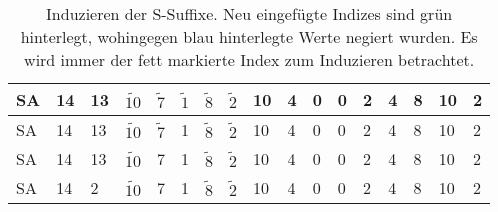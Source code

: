 \begin{table}
{\begin{tabular}{l|lllllllllllllll|l}
			SA & 14                         & 13 & $\widetilde{10}$ & \cellcolor[HTML]{32CB00}$\widetilde{7}$ & \textbf{$\widetilde{1}$}                & \cellcolor[HTML]{3166FF}$\widetilde{8}$ & $\widetilde{2}$                         & 10                         & 4                         & 0 & 0  & 2  & 4  & 8  & 10 & \cellcolor[HTML]{32CB00}2 \\ \hline
			SA & 14                         & 13 & $\widetilde{10}$ & \textbf{$\widetilde{7}$}                & \cellcolor[HTML]{3166FF}1               & $\widetilde{8}$                         & $\widetilde{2}$                         & 10                         & 4                         & 0 & 0  & 2  & 4  & 8  & 10 & 2                         \\ \hline
			SA & 14                         & 13 & $\widetilde{10}$ & \cellcolor[HTML]{3166FF}7               & 1                                       & $\widetilde{8}$                         & $\widetilde{2}$                         & 10                         & 4                         & 0 & 0  & 2  & 4  & 8  & 10 & 2                         \\ \hline
			SA & \cellcolor[HTML]{32CB00}14 & 2  & $\widetilde{10}$ & 7                                       & 1                                       & $\widetilde{8}$                         & $\widetilde{2}$                         & 10                         & 4                         & 0 & 0  & 2  & 4  & 8  & 10 & 2 \\ \hline                       
		\end{tabular}%
	}
	\caption{Induzieren der S-Suffixe. Neu eingefügte Indizes sind grün hinterlegt, wohingegen blau hinterlegte Werte negiert wurden. Es wird immer der fett markierte Index zum Induzieren betrachtet.}
	\label{dss:table:induce-s}
\end{table}

